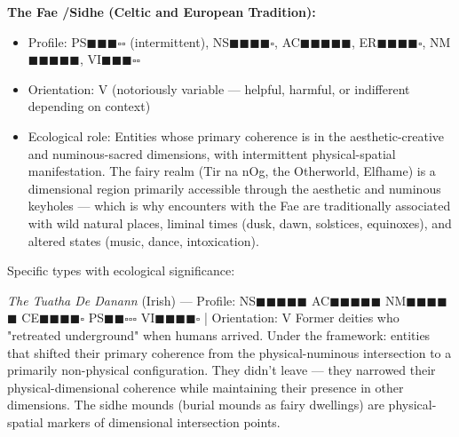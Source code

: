 \textbf{The Fae /\allowbreak  Sidhe (Celtic and European Tradition):}

\begin{itemize}[nosep,leftmargin=*]
  \item Profile: PS$\blacksquare$$\blacksquare$$\blacksquare$$\square$$\square$ (intermittent), NS$\blacksquare$$\blacksquare$$\blacksquare$$\blacksquare$$\square$, AC$\blacksquare$$\blacksquare$$\blacksquare$$\blacksquare$$\blacksquare$, ER$\blacksquare$$\blacksquare$$\blacksquare$$\blacksquare$$\square$, NM$\blacksquare$$\blacksquare$$\blacksquare$$\blacksquare$$\blacksquare$, VI$\blacksquare$$\blacksquare$$\blacksquare$$\square$$\square$
  \item Orientation: V (notoriously variable — helpful, harmful, or indifferent depending on context)
  \item Ecological role: Entities whose primary coherence is in the aesthetic-creative and numinous-sacred dimensions, with intermittent physical-spatial manifestation. The fairy realm (Tir na nOg, the Otherworld, Elfhame) is a dimensional region primarily accessible through the aesthetic and numinous keyholes — which is why encounters with the Fae are traditionally associated with wild natural places, liminal times (dusk, dawn, solstices, equinoxes), and altered states (music, dance, intoxication).
\end{itemize}


Specific types with ecological significance:


\textit{The Tuatha De Danann} (Irish) — Profile: NS$\blacksquare$$\blacksquare$$\blacksquare$$\blacksquare$$\blacksquare$ AC$\blacksquare$$\blacksquare$$\blacksquare$$\blacksquare$$\blacksquare$ NM$\blacksquare$$\blacksquare$$\blacksquare$$\blacksquare$$\blacksquare$ CE$\blacksquare$$\blacksquare$$\blacksquare$$\blacksquare$$\square$ PS$\blacksquare$$\blacksquare$$\square$$\square$$\square$ VI$\blacksquare$$\blacksquare$$\blacksquare$$\blacksquare$$\square$ | Orientation: V Former deities who "retreated underground" when humans arrived. Under the framework: entities that shifted their primary coherence from the physical-numinous intersection to a primarily non-physical configuration. They didn't leave — they narrowed their physical-dimensional coherence while maintaining their presence in other dimensions. The sidhe mounds (burial mounds as fairy dwellings) are physical-spatial markers of dimensional intersection points.


